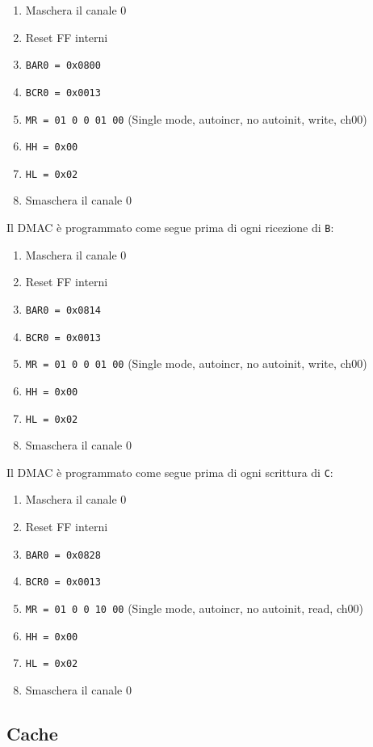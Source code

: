 \documentclass[a4paper]{article}
\begin{document}
\begin{enumerate}
\item Maschera il canale 0
\item Reset FF interni
\item \texttt{BAR0 = 0x0800}
\item \texttt{BCR0 = 0x0013}
\item \texttt{MR = 01 0 0 01 00} (Single mode, autoincr, no autoinit, write, ch00)
\item \texttt{HH = 0x00}
\item \texttt{HL = 0x02}
\item Smaschera il canale 0 
\end{enumerate}

Il DMAC è programmato come segue prima di ogni ricezione di \texttt{B}:

\begin{enumerate}
\item Maschera il canale 0
\item Reset FF interni
\item \texttt{BAR0 = 0x0814}
\item \texttt{BCR0 = 0x0013}
\item \texttt{MR = 01 0 0 01 00} (Single mode, autoincr, no autoinit, write, ch00)
\item \texttt{HH = 0x00}
\item \texttt{HL = 0x02}
\item Smaschera il canale 0 
\end{enumerate}

Il DMAC è programmato come segue prima di ogni scrittura di \texttt{C}:

\begin{enumerate}
\item Maschera il canale 0
\item Reset FF interni
\item \texttt{BAR0 = 0x0828}
\item \texttt{BCR0 = 0x0013}
\item \texttt{MR = 01 0 0 10 00} (Single mode, autoincr, no autoinit, read, ch00)
\item \texttt{HH = 0x00}
\item \texttt{HL = 0x02}
\item Smaschera il canale 0
\end{enumerate}

\subsection{Cache}
\end{document}
